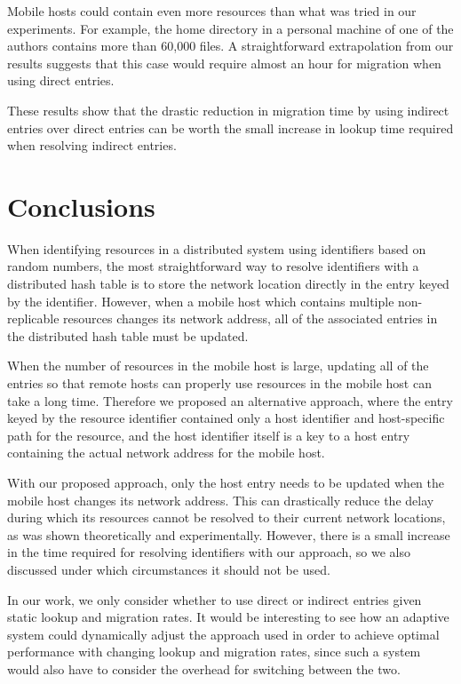 \documentclass{article}
\begin{document}
Mobile hosts could contain even more resources than what was tried in
our experiments.  For example, the home directory in a personal
machine of one of the authors contains more than 60,000 files.  A
straightforward extrapolation from our results suggests that this case
would require almost an hour for migration when using direct entries.

These results show that the drastic reduction in migration time by
using indirect entries over direct entries can be worth the small
increase in lookup time required when resolving indirect entries.


\section{Conclusions}
\label{sec:conclude}

When identifying resources in a distributed system using identifiers
based on random numbers, the most straightforward way to resolve
identifiers with a distributed hash table is to store the network
location directly in the entry keyed by the identifier.  However, when
a mobile host which contains multiple non-replicable resources changes
its network address, all of the associated entries in the distributed
hash table must be updated.

When the number of resources in the mobile host is large, updating all
of the entries so that remote hosts can properly use resources in the
mobile host can take a long time.  Therefore we proposed an
alternative approach, where the entry keyed by the resource identifier
contained only a host identifier and host-specific path for the
resource, and the host identifier itself is a key to a host entry
containing the actual network address for the mobile host.

With our proposed approach, only the host entry needs to be updated
when the mobile host changes its network address.  This can
drastically reduce the delay during which its resources cannot be
resolved to their current network locations, as was shown
theoretically and experimentally.  However, there is a small increase
in the time required for resolving identifiers with our approach, so
we also discussed under which circumstances it should not be used.

In our work, we only consider whether to use direct or indirect
entries given static lookup and migration rates.  It would be
interesting to see how an adaptive system could dynamically adjust the
approach used in order to achieve optimal performance with changing
lookup and migration rates, since such a system would also have to
consider the overhead for switching between the two.
\end{document}
